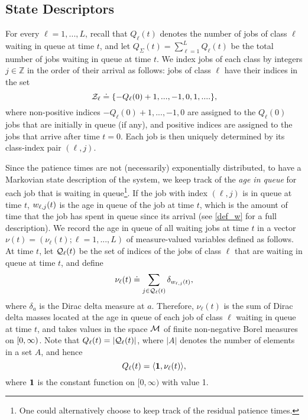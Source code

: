 \documentclass{article}
\theoremstyle{definition}
\numberwithin{equation}{section}
\begin{document}
\subsection{State Descriptors} \label{sec_state}
For every $\ell=1,...,L$, recall that $Q_\ell(t)$ denotes the number of jobs of class $\ell$ waiting in queue at time $t$, and let $Q_\Sigma(t)=\sum_{\ell=1}^LQ_\ell(t)$ be the total number of jobs waiting in queue at time $t$. We index jobs of each class by integers $j\in\mathbb{Z}$ in the order of their arrival as follows: jobs of class $\ell$ have their indices in the set
\[
\mathcal{Z}_\ell \doteq \{-Q_\ell(0)+1,...,-1,0,1,....\},
\]
where non-positive indices $-Q_\ell(0)+1,...,-1,0$ are assigned to the $Q_\ell(0)$ jobs that are initially in queue (if any), and positive indices are assigned to the jobs that arrive after time $t=0$. Each job is then uniquely determined by its class-index pair $(\ell,j)$. 

Since the patience times are not (necessarily) exponentially distributed, to have a Markovian state description of the system, we keep track of the \textit{age in queue} for each job that is waiting in queue\footnote{One could alternatively choose to keep track of the residual patience times.}. If the job with index $(\ell,j)$ is in queue at time $t$,  $w_{\ell,j}(t)$ is the age in queue of the job at time $t$, which is the amount of time that the job has spent in queue since its arrival (see \eqref{def_w} for a full description). We record the age in queue of all waiting jobs at time $t$ in a vector $\nu(t)=(\nu_\ell(t);\ell=1,...,L)$ of measure-valued variables defined as follows. At time $t$, let $\mathcal{Q}_\ell(t)$ be the set of indices of the jobs of class $\ell$ that are waiting in queue at time $t$,  and define
\begin{equation}\label{def_nuk_early}
  \nu_\ell(t)\doteq \sum_{j\in\mathcal{Q}_\ell(t)}\delta_{w_{\ell,j}(t)},
\end{equation}
where $\delta_a$ is the Dirac delta measure at $a$. Therefore, $\nu_\ell(t)$ is the sum of Dirac delta masses located at the age in queue of each job of class $\ell$ waiting in queue at time $t$, and takes values in the space $\mathcal{M}$ of finite non-negative Borel measures on $[0,\infty)$. Note that $Q_\ell(t)=|\mathcal{Q}_\ell(t)|$, where $|A|$ denotes the number of elements in a set $A$, and hence
\begin{equation}
  \ql_\ell(t)=\langle\f1,\nu_\ell(t)\rangle,
\end{equation}
where $\f1$ is the constant function on $[0,\infty)$ with value 1.
\end{document}
